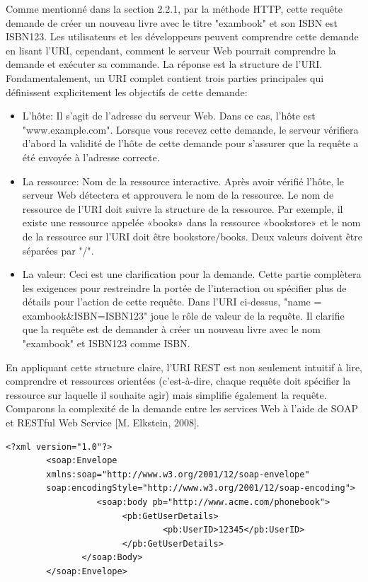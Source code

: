 Comme mentionné dans la section 2.2.1, par la méthode HTTP, cette requête demande de créer un nouveau livre avec le titre "exambook" et son ISBN est ISBN123. Les utilisateurs et les développeurs peuvent comprendre cette demande en lisant l'URI, cependant, comment le serveur Web pourrait comprendre la demande et exécuter sa commande. La réponse est la structure de l'URI. Fondamentalement, un URI complet contient trois parties principales qui définissent explicitement les objectifs de cette demande:
\begin{itemize}
\item L'hôte: Il s'agit de l'adresse du serveur Web. Dans ce cas, l'hôte est "www.example.com". Lorsque vous recevez cette demande, le serveur vérifiera d'abord la validité de l'hôte de cette demande pour s'assurer que la requête a été envoyée à l'adresse correcte.
\item La ressource: Nom de la ressource interactive. Après avoir vérifié l'hôte, le serveur Web détectera et approuvera le nom de la ressource. Le nom de ressource de l'URI doit suivre la structure de la ressource. Par exemple, il existe une ressource appelée «books» dans la ressource «bookstore» et le nom de la ressource sur l'URI doit être bookstore/books. Deux valeurs doivent être séparées par "/".
\item La valeur: Ceci est une clarification pour la demande. Cette partie complètera les exigences pour restreindre la portée de l'interaction ou spécifier plus de détails pour l'action de cette requête. Dans l'URI ci-dessus, "name = exambook\&ISBN=ISBN123" joue le rôle de valeur de la requête. Il clarifie que la requête est de demander à créer un nouveau livre avec le nom "exambook" et ISBN123 comme ISBN.
\end{itemize}
En appliquant cette structure claire, l'URI REST est non seulement intuitif à lire, comprendre et ressources orientées (c'est-à-dire, chaque requête doit spécifier la ressource sur laquelle il souhaite agir) mais simplifie également la requête.
Comparons la complexité de la demande entre les services Web à l'aide de SOAP et RESTful Web Service [M. Elkstein, 2008].
\begin{verbatim}
<?xml version="1.0"?>
        <soap:Envelope
        xmlns:soap="http://www.w3.org/2001/12/soap-envelope" 
        soap:encodingStyle="http://www.w3.org/2001/12/soap-encoding">
                  <soap:body pb="http://www.acme.com/phonebook"> 
                       <pb:GetUserDetails>
                               <pb:UserID>12345</pb:UserID>
                       </pb:GetUserDetails>
               </soap:Body>
        </soap:Envelope>
\end{verbatim}
